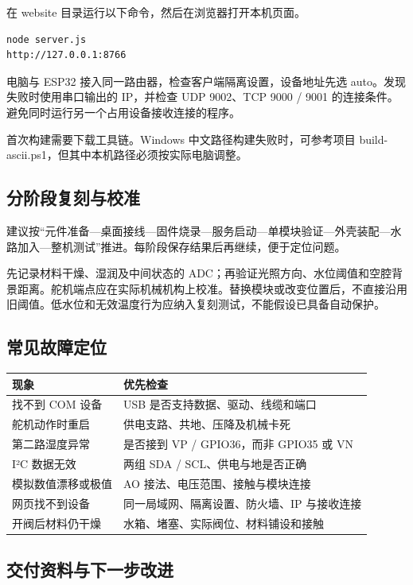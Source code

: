\documentclass[10pt,a4paper]{article}
\begin{document}
在 website 目录运行以下命令，然后在浏览器打开本机页面。


\begingroup\small\begin{verbatim}
node server.js
http://127.0.0.1:8766
\end{verbatim}\endgroup

电脑与 ESP32 接入同一路由器，检查客户端隔离设置，设备地址先选 auto。发现失败时使用串口输出的 IP，并检查 UDP 9002、TCP 9000 / 9001 的连接条件。避免同时运行另一个占用设备接收连接的程序。


首次构建需要下载工具链。Windows 中文路径构建失败时，可参考项目 build-ascii.ps1，但其中本机路径必须按实际电脑调整。


\clearpage

\subsection{分阶段复刻与校准}

建议按“元件准备—桌面接线—固件烧录—服务启动—单模块验证—外壳装配—水路加入—整机测试”推进。每阶段保存结果后再继续，便于定位问题。


先记录材料干燥、湿润及中间状态的 ADC；再验证光照方向、水位阈值和空腔背景距离。舵机端点应在实际机械机构上校准。替换模块或改变位置后，不直接沿用旧阈值。低水位和无效温度行为应纳入复刻测试，不能假设已具备自动保护。


\subsection{常见故障定位}

\begin{longtable}{p{54mm}p{111mm}}
\toprule
\textbf{现象} & \textbf{优先检查}\\\midrule\endhead
找不到 COM 设备 & USB 是否支持数据、驱动、线缆和端口\\
舵机动作时重启 & 供电支路、共地、压降及机械卡死\\
第二路湿度异常 & 是否接到 VP / GPIO36，而非 GPIO35 或 VN\\
I²C 数据无效 & 两组 SDA / SCL、供电与地是否正确\\
模拟数值漂移或极值 & AO 接法、电压范围、接触与模块连接\\
网页找不到设备 & 同一局域网、隔离设置、防火墙、IP 与接收连接\\
开阀后材料仍干燥 & 水箱、堵塞、实际阀位、材料铺设和接触\\
\bottomrule\end{longtable}

\subsection{交付资料与下一步改进}
\end{document}
